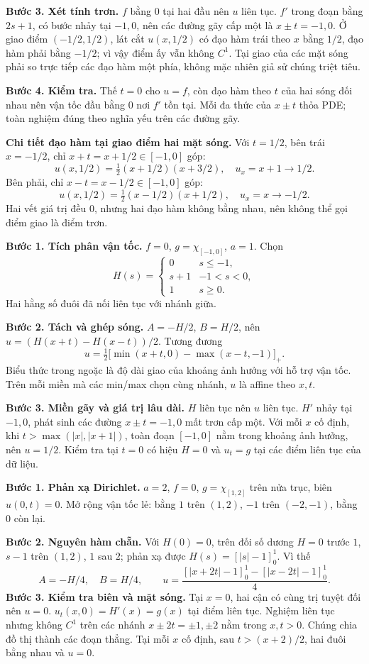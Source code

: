 \textbf{Bước 3. Xét tính trơn.} $f$ bằng $0$ tại hai đầu nên $u$ liên tục. $f'$ trong đoạn bằng $2s+1$, có bước nhảy tại $-1,0$, nên các đường gãy cấp một là $x\pm t=-1,0$. Ở giao điểm $(-1/2,1/2)$, lát cắt $u(x,1/2)$ có đạo hàm trái theo $x$ bằng $1/2$, đạo hàm phải bằng $-1/2$; vì vậy điểm ấy vẫn không $C^1$. Tại giao của các mặt sóng phải so trực tiếp các đạo hàm một phía, không mặc nhiên giả sử chúng triệt tiêu.

\textbf{Bước 4. Kiểm tra.} Thế $t=0$ cho $u=f$, còn đạo hàm theo $t$ của hai sóng đối nhau nên vận tốc đầu bằng $0$ nơi $f'$ tồn tại. Mỗi đa thức của $x\pm t$ thỏa PDE; toàn nghiệm đúng theo nghĩa yếu trên các đường gãy.

\textbf{Chi tiết đạo hàm tại giao điểm hai mặt sóng.} Với $t=1/2$, bên trái $x=-1/2$, chỉ $x+t=x+1/2\in[-1,0]$ góp:
\[u(x,1/2)=\tfrac12(x+1/2)(x+3/2),\quad u_x=x+1\to1/2.\]
Bên phải, chỉ $x-t=x-1/2\in[-1,0]$ góp:
\[u(x,1/2)=\tfrac12(x-1/2)(x+1/2),\quad u_x=x\to-1/2.\]
Hai vết giá trị đều $0$, nhưng hai đạo hàm không bằng nhau, nên không thể gọi điểm giao là điểm trơn.

\textbf{Bước 1. Tích phân vận tốc.} $f=0$, $g=\chi_{[-1,0]}$, $a=1$. Chọn
\[H(s)=\begin{cases}0&s\le-1,\\s+1&-1<s<0,\\1&s\ge0.\end{cases}\]
Hai hằng số đuôi đã nối liên tục với nhánh giữa.

\textbf{Bước 2. Tách và ghép sóng.} $A=-H/2$, $B=H/2$, nên $u=(H(x+t)-H(x-t))/2$. Tương đương
\[u=\tfrac12\big[\min(x+t,0)-\max(x-t,-1)\big]_+.\]
Biểu thức trong ngoặc là độ dài giao của khoảng ảnh hưởng với hỗ trợ vận tốc. Trên mỗi miền mà các min/max chọn cùng nhánh, $u$ là affine theo $x,t$.

\textbf{Bước 3. Miền gãy và giá trị lâu dài.} $H$ liên tục nên $u$ liên tục. $H'$ nhảy tại $-1,0$, phát sinh các đường $x\pm t=-1,0$ mất trơn cấp một. Với mỗi $x$ cố định, khi $t>\max(|x|,|x+1|)$, toàn đoạn $[-1,0]$ nằm trong khoảng ảnh hưởng, nên $u=1/2$. Kiểm tra tại $t=0$ có hiệu $H=0$ và $u_t=g$ tại các điểm liên tục của dữ liệu.

\textbf{Bước 1. Phản xạ Dirichlet.} $a=2$, $f=0$, $g=\chi_{[1,2]}$ trên nửa trục, biên $u(0,t)=0$. Mở rộng vận tốc lẻ: bằng $1$ trên $(1,2)$, $-1$ trên $(-2,-1)$, bằng $0$ còn lại.

\textbf{Bước 2. Nguyên hàm chẵn.} Với $H(0)=0$, trên đối số dương $H=0$ trước $1$, $s-1$ trên $(1,2)$, $1$ sau $2$; phản xạ được $H(s)=[|s|-1]_0^1$. Vì thế
\[A=-H/4,\quad B=H/4,\qquad u=\frac{[|x+2t|-1]_0^1-[|x-2t|-1]_0^1}{4}.\]
\textbf{Bước 3. Kiểm tra biên và mặt sóng.} Tại $x=0$, hai cận có cùng trị tuyệt đối nên $u=0$. $u_t(x,0)=H'(x)=g(x)$ tại điểm liên tục. Nghiệm liên tục nhưng không $C^1$ trên các nhánh $x\pm2t=\pm1,\pm2$ nằm trong $x,t>0$. Chúng chia đồ thị thành các đoạn thẳng. Tại mỗi $x$ cố định, sau $t>(x+2)/2$, hai đuôi bằng nhau và $u=0$.

